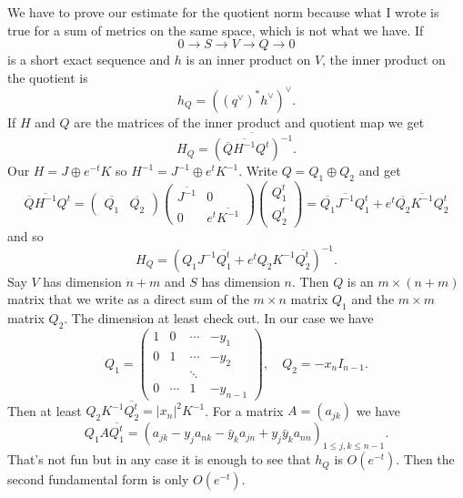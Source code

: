 \documentclass[10pt,a4paper]{amsart}
\def\ov#1{\overline{#1}}
\begin{document}
We have to prove our estimate for the quotient norm because what I wrote is true
for a sum of metrics on the same space, which is not what we have.
If
$$
0 \to S \to V \to Q \to 0
$$
is a short exact sequence and $h$ is an inner product on $V$, the inner product
on the quotient is
$$
h_Q = ((q^\vee)^{*} h^\vee)^\vee.
$$
If $H$ and $Q$ are the matrices of the inner product and quotient map we get
$$
H_Q = \ov{(\ov Q \ov{H^{-1}} Q^t)^{-1}}.
$$
Our $H = J \oplus e^{-t} K$ so $H^{-1} = J^{-1} \oplus e^{t} K^{-1}$.
Write $Q = Q_1 \oplus Q_2$ and get
$$
\ov{Q} \ov{H^{-1}} Q^t
=
\begin{pmatrix}
\ov{Q_1} & \ov{Q_2}
\end{pmatrix}
\begin{pmatrix}
\ov{J^{-1}} & 0
\\
0 & e^{t} \ov{K^{-1}}
\end{pmatrix}
\begin{pmatrix}
Q_1^t \\ Q_2^t
\end{pmatrix}
=
\ov{Q_1} \ov{J^{-1}} Q_1^t
+ e^{t} \ov{Q_2} \ov{K^{-1}} Q_2^t
$$
and so
$$
H_Q
=
(Q_1 J^{-1} \ov{Q_1^t}
+ e^{t} Q_2 K^{-1} \ov{Q_2^t})^{-1}.
$$
Say $V$ has dimension $n + m$ and $S$ has dimension $n$.
Then $Q$ is an $m \times (n+m)$ matrix that we write as a direct sum of
the $m \times n$ matrix $Q_1$ and the $m \times m$ matrix $Q_2$.
The dimension at least check out.
In our case we have
$$
Q_1 =
\begin{pmatrix}
1 & 0 & \cdots & -y_1
\\
0 & 1 & \cdots & -y_2
\\
  & & \ddots &
\\
0 & \cdots & 1 & -y_{n-1}
\end{pmatrix},
\quad
Q_2 = -x_n I_{n-1}.
$$
Then at least $Q_2 K^{-1} \ov{Q_2^t} = |x_n|^2 K^{-1}$.
For a matrix $A = (a_{jk})$ we have
$$
Q_1 A \ov{Q_1^t}
= (a_{jk} - y_j a_{nk} - \bar y_k a_{jn} + y_j \bar y_k a_{nn})_{1 \leq j,k \leq n-1}.
$$
That's not fun but in any case it is enough to see that $h_Q$ is $O(e^{-t})$.
Then the second fundamental form is only $O(e^{-t})$.
\end{document}
